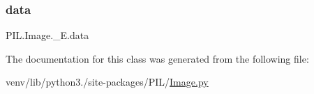\subsubsection{\texorpdfstring{data}{data}}
{\footnotesize\ttfamily P\+I\+L.\+Image.\+\_\+\+E.\+data}



The documentation for this class was generated from the following file\+:\begin{DoxyCompactItemize}
\item 
venv/lib/python3./site-\/packages/\+P\+I\+L/\hyperlink{Image_8py}{Image.\+py}\end{DoxyCompactItemize}
